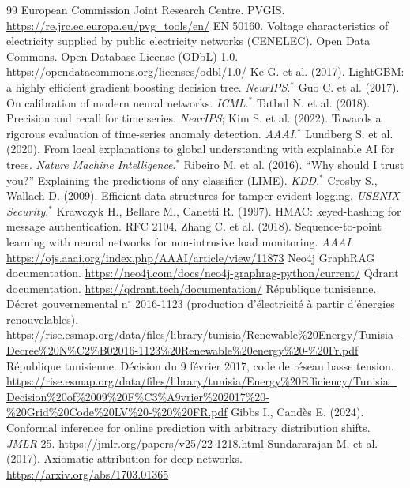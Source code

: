 \begin{thebibliography}{99}
 European Commission Joint Research Centre. PVGIS. \url{https://re.jrc.ec.europa.eu/pvg_tools/en/}
 EN 50160. Voltage characteristics of electricity supplied by public electricity networks (CENELEC).
 Open Data Commons. Open Database License (ODbL) 1.0. \url{https://opendatacommons.org/licenses/odbl/1.0/}
 Ke G. et al. (2017). LightGBM: a highly efficient gradient boosting decision tree. \emph{NeurIPS}.$^{*}$
 Guo C. et al. (2017). On calibration of modern neural networks. \emph{ICML}.$^{*}$
 Tatbul N. et al. (2018). Precision and recall for time series. \emph{NeurIPS}; Kim S. et al. (2022). Towards a rigorous evaluation of time-series anomaly detection. \emph{AAAI}.$^{*}$
 Lundberg S. et al. (2020). From local explanations to global understanding with explainable AI for trees. \emph{Nature Machine Intelligence}.$^{*}$
 Ribeiro M. et al. (2016). ``Why should I trust you?'' Explaining the predictions of any classifier (LIME). \emph{KDD}.$^{*}$
 Crosby S., Wallach D. (2009). Efficient data structures for tamper-evident logging. \emph{USENIX Security}.$^{*}$
 Krawczyk H., Bellare M., Canetti R. (1997). HMAC: keyed-hashing for message authentication. RFC 2104.
 Zhang C. et al. (2018). Sequence-to-point learning with neural networks for non-intrusive load monitoring. \emph{AAAI}. \url{https://ojs.aaai.org/index.php/AAAI/article/view/11873}
 Neo4j GraphRAG documentation. \url{https://neo4j.com/docs/neo4j-graphrag-python/current/}
 Qdrant documentation. \url{https://qdrant.tech/documentation/}
 R\'epublique tunisienne. D\'ecret gouvernemental n$^\circ$ 2016-1123 (production d'\'electricit\'e \`a partir d'\'energies renouvelables). \url{https://rise.esmap.org/data/files/library/tunisia/Renewable\%20Energy/Tunisia_Decree\%20N\%C2\%B02016-1123\%20Renewable\%20energy\%20-\%20Fr.pdf}
 R\'epublique tunisienne. D\'ecision du 9 f\'evrier 2017, code de r\'eseau basse tension. \url{https://rise.esmap.org/data/files/library/tunisia/Energy\%20Efficiency/Tunisia_Decision\%20of\%2009\%20F\%C3\%A9vrier\%202017\%20-\%20Grid\%20Code\%20LV\%20-\%20\%20FR.pdf}
 Gibbs I., Cand\`es E. (2024). Conformal inference for online prediction with arbitrary distribution shifts. \emph{JMLR} 25. \url{https://jmlr.org/papers/v25/22-1218.html}
 Sundararajan M. et al. (2017). Axiomatic attribution for deep networks. \url{https://arxiv.org/abs/1703.01365}

\end{thebibliography}
